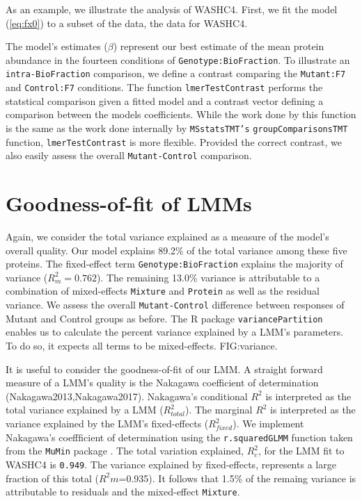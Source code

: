 \documentclass[11pt]{elife}\usepackage[]{graphicx}\usepackage[]{color}
\begin{document}
As an example, we illustrate the
analysis of WASHC4.  First, we fit the model (\ref{eq:fx0}) to a subset of the
data, the data for WASHC4.

The model's estimates ($\beta$) represent our best estimate of the mean protein
abundance in the fourteen conditions of \texttt{Genotype:BioFraction}. 
To illustrate an \texttt{intra-BioFraction} comparison, we 
define a contrast comparing the \texttt{Mutant:F7} and \texttt{Control:F7}
conditions. The function \texttt{lmerTestContrast} performs the statstical comparison given
a fitted model and a contrast vector defining a comparison between the models
coefficients. While the work done by this function 
is the same as the work done internally by \texttt{MSstatsTMT's}
\texttt{groupComparisonsTMT} function, \texttt{lmerTestContrast} is more
flexible. Provided the correct contrast, we also easily assess the overall
\texttt{Mutant-Control} comparison.\\

\section{Goodness-of-fit of LMMs}

Again, we consider the total variance explained as a measure of the model's
overall quality. Our model explains 89.2\% of the total variance among these
five proteins. The fixed-effect term \texttt{Genotype:BioFraction} explains the
majority of variance ($R^2_m=0.762$). The remaining 13.0\% variance is
attributable to a combination of mixed-effects \texttt{Mixture} and
\texttt{Protein} as well as the residual variance. We assess the overall
\texttt{Mutant-Control} difference between responses of Mutant and Control
groups as before. The R package \texttt{variancePartition} enables us to
calculate the percent variance explained by a LMM's parameters. To do so, it
expects all terms to be mixed-effects. FIG:variance.

It is useful to consider the goodness-of-fit of our LMM. A straight forward
measure of a LMM's quality is the Nakagawa coefficient of 
determination (Nakagawa2013,Nakagawa2017). Nakagawa's conditional $R^2$ is 
interpreted as the total variance explained by a LMM ($R^2_{total}$).
The marginal $R^2$ is interpreted as the variance explained by the LMM's 
fixed-effects ($R^2_{fixed}$). We implement Nakagawa's coeffficient of 
determination using the \texttt{r.squaredGLMM} function taken from the 
\texttt{MuMin} package \citep{WangMerkle2018}.
The total variation explained, $R^2_{c}$, for the LMM fit to WASHC4 is 
\texttt{0.949}. The variance explained by fixed-effects, represents a large
fraction of this total ($R^2{m}$=0.935). It follows that 1.5\% of the remaing
variance is attributable to residuals and the mixed-effect \texttt{Mixture}.\\
\end{document}
